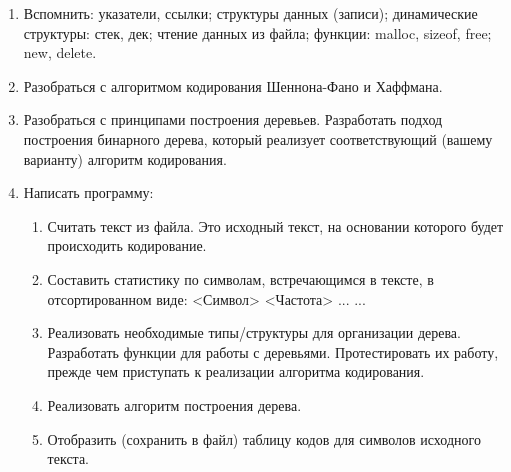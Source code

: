 \begin{enumerate}
    \item Вспомнить: указатели, ссылки; структуры данных (записи); динамические структуры: стек, дек; чтение данных из файла; функции: malloc, sizeof, free; new, delete.
    \item Разобраться с алгоритмом кодирования Шеннона-Фано и Хаффмана.
    \item Разобраться с принципами построения деревьев. Разработать подход построения бинарного дерева, который реализует соответствующий (вашему варианту) алгоритм кодирования.
    \item Написать программу:
    \begin{enumerate}
        \item Считать текст из файла. Это исходный текст, на основании которого будет происходить кодирование.
        \item Составить статистику по символам, встречающимся в тексте, в отсортированном виде: <Символ> <Частота> ... ...
        \item Реализовать необходимые типы/структуры для организации дерева. Разработать функции для работы с деревьями. Протестировать их работу, прежде чем приступать к реализации алгоритма кодирования.
        \item Реализовать алгоритм построения дерева.
        \item Отобразить (сохранить в файл) таблицу кодов для символов исходного текста.
    \end{enumerate}
\end{enumerate}
